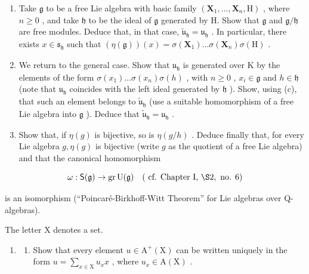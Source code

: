 \begin{enumerate}
\def\labelenumi{(\alph{enumi})}
\setcounter{enumi}{2}
\item
  Take \(\mathfrak{g}\) to be a free Lie algebra with basic family \((\mathbf{X}_1, \ldots, \mathbf{X}_n, \mathrm{H})\) , where \(n \geqslant 0\) , and take \(\mathfrak{h}\) to be the ideal of \(\mathfrak{g}\) generated by H. Show that \(\mathfrak{g}\) and \(\mathfrak{g} / \mathfrak{h}\) are free modules. Deduce that, in that case, \(\tilde{\mathfrak{u}}_{\mathfrak{h}} = \mathfrak{u}_{\mathfrak{h}}\) . In particular, there exists \(x \in \mathfrak{s}_{\mathfrak{h}}\) such that \((\eta(\mathfrak{g}))(x) = \sigma(\mathbf{X}_1) \ldots \sigma(\mathbf{X}_n) \sigma(\mathrm{H})\) .
\item
  We return to the general case. Show that \(\mathfrak{u}_{\mathfrak{h}}\) is generated over \(\mathrm{K}\) by the elements of the form \(\sigma(x_1) \ldots \sigma(x_n)\sigma(h)\) , with \(n \geqslant 0\) , \(x_i \in \mathfrak{g}\) and \(h \in \mathfrak{h}\) (note that \(\mathfrak{u}_{\mathfrak{h}}\) coincides with the left ideal generated by \(\mathfrak{h}\) ). Show, using (c), that such an element belongs to \(\tilde{\mathfrak{u}}_{\mathfrak{h}}\) (use a suitable homomorphism of a free Lie algebra into \(\mathfrak{g}\) ). Deduce that \(\tilde{\mathfrak{u}}_{\mathfrak{h}} = \mathfrak{u}_{\mathfrak{h}}\) .
\item
  Show that, if \(\eta(g)\) is bijective, so is \(\eta(g/h)\) . Deduce finally that, for every Lie algebra \(g, \eta(g)\) is bijective (write \(g\) as the quotient of a free Lie algebra) and that the canonical homomorphism
\end{enumerate}

\[
\omega : \mathsf {S} (\mathfrak {g}) \to \operatorname{gr} \mathrm{U} (\mathfrak {g}) \quad (\text { cf.   Chapter   I,   } \S 2, \text {   no.   } 6)
\]

is an isomorphism (``Poincaré-Birkhoff-Witt Theorem'' for Lie algebras over Q-algebras).


The letter X denotes a set.

\begin{enumerate}
\def\labelenumi{\arabic{enumi}.}
\tightlist
\item
  \begin{enumerate}
  \def\labelenumii{(\alph{enumii})}
  \tightlist
  \item
    Show that every element \(u \in \mathrm{A}^{+}(\mathrm{X})\) can be written uniquely in the form \(u = \sum_{x \in \mathrm{X}} u_{x} x\) , where \(u_{x} \in \mathrm{A}(\mathrm{X})\) .
  \end{enumerate}
\end{enumerate}

